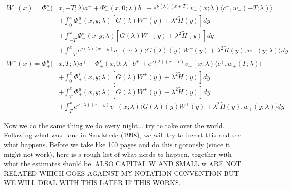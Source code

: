 \documentclass[12pt]{article}
\begin{document}
\begin{align*}
W^-(x) = \Phi^s_-(&x, -T; \lambda)a^- + \Phi^u_-(x, 0; \lambda)b^- + e^{\nu(\lambda)(x+T)} v_-(x; \lambda) \langle c^-, w_-(-T; \lambda) \rangle \\
&+ \int_0^x \Phi^u_-(x, y; \lambda)[ G(\lambda)W^-(y) + \lambda^2 \tilde{H}(y) ] dy \\
&+ \int_{-T}^x \Phi^s_-(x, y; \lambda) [ G(\lambda)W^-(y) + \lambda^2 \tilde{H}(y) ] dy \\
&+ \int_{-T}^x 
e^{\nu(\lambda)(x-y)} v_-(x; \lambda) \langle G(\lambda)(y)W^-(y) + \lambda^2 \tilde{H}(y), w_-(y; \lambda) \rangle dy \\
W^+(x) = \Phi^u_+(&x, T; \lambda)a^+ + \Phi^s_+(x, 0; \lambda)b^+ + e^{\nu(\lambda)(x - T)} v_+(x; \lambda) \langle c^+, w_+(T; \lambda) \rangle \\
&+ \int_0^x \Phi^s_+(x, y; \lambda) [ G(\lambda)W^+(y) + \lambda^2 \tilde{H}(y) ] dy \\
&+ \int_T^x \Phi^u_+(x, y; \lambda) [ G(\lambda)W^+(y) + \lambda^2 \tilde{H}(y) ] dy \\
&+ \int_T^x e^{\nu(\lambda)(x-y)} v_+(x; \lambda) \langle G(\lambda)(y)W^+(y) + \lambda^2 \tilde{H}(y), w_+(y; \lambda) \rangle dy
\end{align*}

Now we do the same thing we do every night... try to take over the world. Following what was done in Sandstede (1998), we will try to invert this and see what happens. Before we take like 100 pages and do this rigorously (since it might not work), here is a rough list of what needs to happen, together with what the estimates should be. ALSO CAPITAL W AND SMALL w ARE NOT RELATED WHICH GOES AGAINST MY NOTATION CONVENTION BUT WE WILL DEAL WITH THIS LATER IF THIS WORKS.
\end{document}
